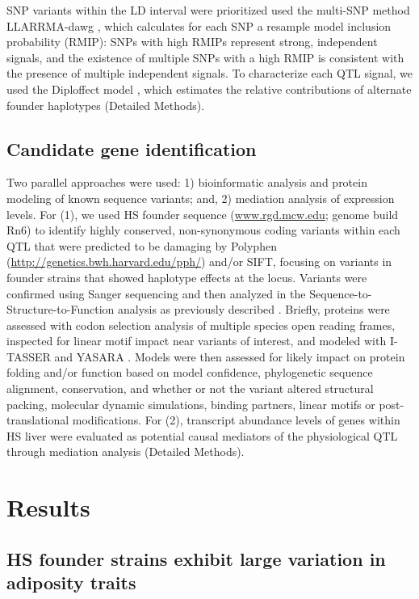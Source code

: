 SNP variants within the LD interval were prioritized used the multi-SNP method LLARRMA-dawg \citep{Sabourin2015}, which calculates for each SNP a resample model inclusion probability (RMIP):  SNPs with high RMIPs represent strong, independent signals, and the existence of multiple SNPs with a high RMIP is consistent with the presence of multiple independent signals. To characterize each QTL signal, we used the Diploffect model \citep{Zhang2014}, which estimates the relative contributions of alternate founder haplotypes (Detailed Methods).

\subsection{Candidate gene identification}

Two parallel approaches were used: 1) bioinformatic analysis and protein modeling of known sequence variants; and, 2) mediation analysis of expression levels. For (1), we used HS founder sequence (\url{www.rgd.mcw.edu}; genome build Rn6) to identify highly conserved, non-synonymous coding variants within each QTL that were predicted to be damaging by Polyphen (\url{http://genetics.bwh.harvard.edu/pph/}) and/or SIFT, focusing on variants in founder strains that showed haplotype effects at the locus. Variants were confirmed using Sanger sequencing and then analyzed in the Sequence-to-Structure-to-Function analysis as previously described \citep{Prokop2017}.  Briefly, proteins were assessed with codon selection analysis of multiple species open reading frames, inspected for linear motif impact near variants of interest, and modeled with I-TASSER \citep{Roy2010} and YASARA \citep{Krieger2009}. Models were then assessed for likely impact on protein folding and/or function based on model confidence, phylogenetic sequence alignment, conservation, and whether or not the variant altered structural packing, molecular dynamic simulations, binding partners, linear motifs or post-translational modifications. For (2), transcript abundance levels of genes within HS liver were evaluated as potential causal mediators of the physiological QTL through mediation analysis \citep{Baron1986} (Detailed Methods).

\section{Results}

\subsection{HS founder strains exhibit large variation in adiposity traits}

